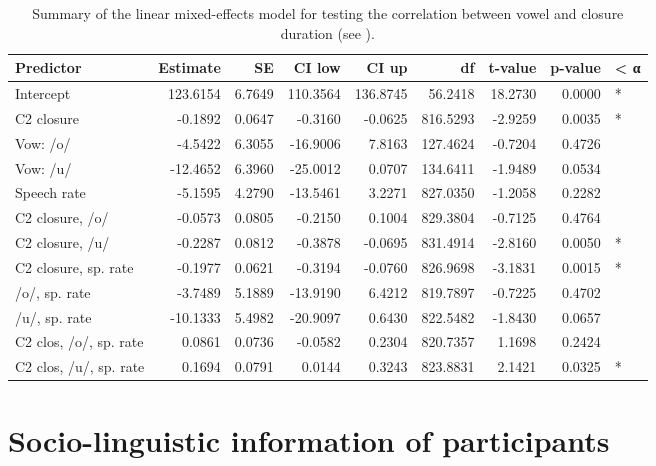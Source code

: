 \documentclass[12pt,]{article}
\begin{document}
\begin{table}

\caption{\label{tab:vow-clo-table}Summary of the linear mixed-effects model for testing the correlation between vowel and closure duration (see ).}
\centering
\begin{tabular}[t]{lrrrrrrrl}
\toprule
Predictor & Estimate & SE & CI low & CI up & df & t-value & p-value & < α\\
\midrule
Intercept & 123.6154 & 6.7649 & 110.3564 & 136.8745 & 56.2418 & 18.2730 & 0.0000 & *\\
C2 closure & -0.1892 & 0.0647 & -0.3160 & -0.0625 & 816.5293 & -2.9259 & 0.0035 & *\\
Vow: /o/ & -4.5422 & 6.3055 & -16.9006 & 7.8163 & 127.4624 & -0.7204 & 0.4726 & \\
Vow: /u/ & -12.4652 & 6.3960 & -25.0012 & 0.0707 & 134.6411 & -1.9489 & 0.0534 & \\
Speech rate & -5.1595 & 4.2790 & -13.5461 & 3.2271 & 827.0350 & -1.2058 & 0.2282 & \\
\addlinespace
C2 closure, /o/ & -0.0573 & 0.0805 & -0.2150 & 0.1004 & 829.3804 & -0.7125 & 0.4764 & \\
C2 closure, /u/ & -0.2287 & 0.0812 & -0.3878 & -0.0695 & 831.4914 & -2.8160 & 0.0050 & *\\
C2 closure, sp. rate & -0.1977 & 0.0621 & -0.3194 & -0.0760 & 826.9698 & -3.1831 & 0.0015 & *\\
/o/, sp. rate & -3.7489 & 5.1889 & -13.9190 & 6.4212 & 819.7897 & -0.7225 & 0.4702 & \\
/u/, sp. rate & -10.1333 & 5.4982 & -20.9097 & 0.6430 & 822.5482 & -1.8430 & 0.0657 & \\
\addlinespace
C2 clos, /o/, sp. rate & 0.0861 & 0.0736 & -0.0582 & 0.2304 & 820.7357 & 1.1698 & 0.2424 & \\
C2 clos, /u/, sp. rate & 0.1694 & 0.0791 & 0.0144 & 0.3243 & 823.8831 & 2.1421 & 0.0325 & *\\
\bottomrule
\end{tabular}
\end{table}

\hypertarget{socio-linguistic-information-of-participants}{%
\section{Socio-linguistic information of
participants}\label{socio-linguistic-information-of-participants}}

\label{a:socioling}
\end{document}

